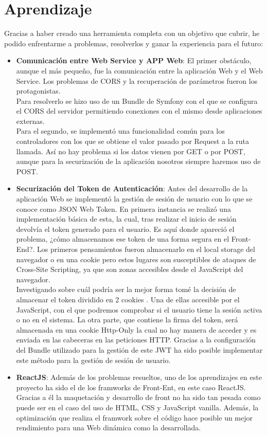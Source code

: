 \section{Aprendizaje}

Gracias a haber creado una herramienta completa con un objetivo que cubrir, he podido enfrentarme a problemas, resolverlos y ganar la experiencia para el futuro:

\begin{itemize}
    \item \textbf{Comunicación entre Web Service y APP Web}: El primer obstáculo, aunque el más pequeño, fue la comunicación entre la aplicación Web y el Web Service. Los problemas de CORS y la recuperación de parámetros fueron los protagonistas.\\
    Para resolverlo se hizo uso de un Bundle de Symfony con el que se configura el CORS del servidor permitiendo conexiones con el mismo desde aplicaciones externas.\\
    Para el segundo, se implementó una funcionalidad común para los controladores con los que se obtiene el valor pasado por Request a la ruta llamada. Así no hay problema si los datos vienen por GET o por POST, aunque para la securización de la aplicación nosotros siempre haremos uso de POST.
    \item \textbf{Securización del Token de Autenticación}: Antes del desarrollo de la aplicación Web se implementó la gestión de sesión de usuario con lo que se conoce como JSON Web Token. En primera instancia se realizó una implementación básica de esta, la cual, tras realizar el inicio de sesión devolvía el token generado para el usuario. Es aquí donde apareció el problema, ¿cómo almacenamos ese token de una forma segura en el Front-End?. Los primeros pensamientos fueron almacenarlo en el local storage del navegador o en una cookie pero estos lugares son susceptibles de ataques de Cross‑Site Scripting, ya que son zonas accesibles desde el JavaScript del navegador.\\
    Investigando sobre cuál podría ser la mejor forma tomé la decisión de almacenar el token dividido en 2 cookies \cite{secure-jwt}. Una de ellas accesible por el JavaScript, con el que podremos comprobar si el usuario tiene la sesión activa o no en el sistema. La otra parte, que contiene la firma del token, será almacenada en una cookie Http-Only la cual no hay manera de acceder y es enviada en las cabeceras en las peticiones HTTP. Gracias a la configuración del Bundle utilizado para la gestión de este JWT ha sido posible implementar este método para la gestión de sesión de usuario.
    \item \textbf{ReactJS}: Además de los problemas resueltos, uno de los aprendizajes en este proyecto ha sido el de los framworks de Front-Ent, en este caso ReactJS. Gracias a él la maquetación y desarrollo de front no ha sido tan pesada como puede ser en el caso del uso de HTML, CSS y JavaScript vanilla. Además, la optimización que realiza el framwork sobre el código hace posible un mejor rendimiento para una Web dinámica como la desarrollada.
\end{itemize}

